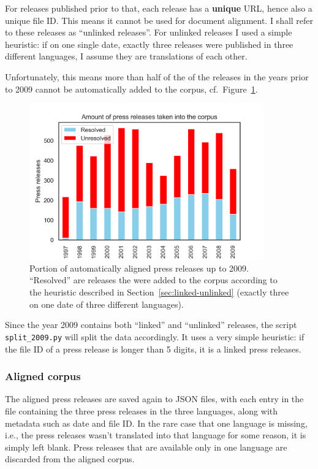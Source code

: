 For releases published prior to that, each release has a \textbf{unique} URL, hence also a unique file ID. 
This means it cannot be used for document alignment. 
I shall refer to these releases as \enquote{unlinked releases}.
For unlinked releases I used a simple heuristic: if on one single date, exactly three releases were published in three different languages, I assume they are translations of each other. 

Unfortunately, this means more than half of the of the releases in the years prior to 2009 cannot be automatically added to the corpus, cf.~Figure~\ref{fig:linked-unlinked}.

\begin{figure}[h]
	\centering
	\includegraphics[width=0.9\textwidth]{graphics/linked-unlinked.png}
	\caption{Portion of automatically aligned press releases up to 2009. 
	\enquote{Resolved} are releases the were added to the corpus according to the heuristic described in Section~\ref{sec:linked-unlinked} (exactly three on one date of three different languages).}
	\label{fig:linked-unlinked}
\end{figure}

Since the year 2009 contains both \enquote{linked} and \enquote{unlinked} releases, the script \texttt{split\_2009.py} will split the data accordingly. 
It uses a very simple heuristic: if the file ID of a press release is longer than 5 digits, it is a linked press releases.

\subsubsection{Aligned corpus}
The aligned press releases are saved again to \acrshort{JSON} files, with each entry in the file containing the three press releases in the three languages, along with metadata such as date and file ID. 
In the rare case that one language is missing, i.e., the press releases wasn't translated into that language for some reason, it is simply left blank. 
Press releases that are available only in one language are discarded from the aligned corpus.

